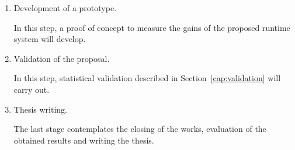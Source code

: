 \begin{enumerate}
\item Development of a prototype.

In this step, a proof of concept to measure the gains of the proposed runtime system will develop.
\item Validation of the proposal.

In this step, statistical validation described in Section~\ref{cap:validation} will carry out.
\item Thesis writing.

The last stage contemplates the closing of the works, evaluation of the obtained results and writing the thesis. 
\end{enumerate}